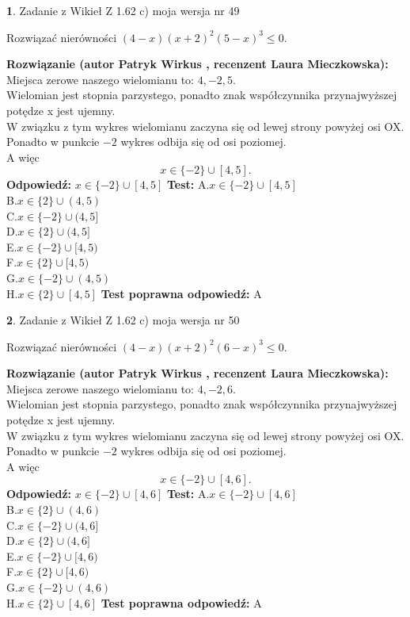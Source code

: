 \documentclass[12pt, a4paper]{article}
\theoremstyle{definition} %
\newtheorem{zad}{}
\newcommand{\zadStart}[1]{\begin{zad}#1\newline}
\newcommand{\zadStop}{\end{zad}}
\newcommand{\rozwStart}[2]{\noindent \textbf{Rozwiązanie (autor #1 , recenzent #2): }\newline}
\newcommand{\rozwStop}{\newline}
\newcommand{\odpStart}{\noindent \textbf{Odpowiedź:}\newline}
\newcommand{\odpStop}{\newline}
\newcommand{\testStart}{\noindent \textbf{Test:}\newline}
\newcommand{\testStop}{\newline}
\newcommand{\kluczStart}{\noindent \textbf{Test poprawna odpowiedź:}\newline}
\newcommand{\kluczStop}{\newline}
\begin{document}
\zadStart{Zadanie z Wikieł Z 1.62 c) moja wersja nr 49}

Rozwiązać nierówności $(4-x)(x+2)^{2}(5-x)^{3}\le0$.
\zadStop
\rozwStart{Patryk Wirkus}{Laura Mieczkowska}
Miejsca zerowe naszego wielomianu to: $4, -2, 5$.\\
Wielomian jest stopnia parzystego, ponadto znak współczynnika przy\linebreak najwyższej potędze x jest ujemny.\\ W związku z tym wykres wielomianu zaczyna się od lewej strony powyżej osi OX.\\
Ponadto w punkcie $-2$ wykres odbija się od osi poziomej.\\
A więc $$x \in \{-2\} \cup [4,5].$$
\rozwStop
\odpStart
$x \in \{-2\} \cup [4,5]$
\odpStop
\testStart
A.$x \in \{-2\} \cup [4,5]$\\
B.$x \in \{2\} \cup (4,5)$\\
C.$x \in \{-2\} \cup (4,5]$\\
D.$x \in \{2\} \cup (4,5]$\\
E.$x \in \{-2\} \cup [4,5)$\\
F.$x \in \{2\} \cup [4,5)$\\
G.$x \in \{-2\} \cup (4,5)$\\
H.$x \in \{2\} \cup [4,5]$
\testStop
\kluczStart
A
\kluczStop



\zadStart{Zadanie z Wikieł Z 1.62 c) moja wersja nr 50}

Rozwiązać nierówności $(4-x)(x+2)^{2}(6-x)^{3}\le0$.
\zadStop
\rozwStart{Patryk Wirkus}{Laura Mieczkowska}
Miejsca zerowe naszego wielomianu to: $4, -2, 6$.\\
Wielomian jest stopnia parzystego, ponadto znak współczynnika przy\linebreak najwyższej potędze x jest ujemny.\\ W związku z tym wykres wielomianu zaczyna się od lewej strony powyżej osi OX.\\
Ponadto w punkcie $-2$ wykres odbija się od osi poziomej.\\
A więc $$x \in \{-2\} \cup [4,6].$$
\rozwStop
\odpStart
$x \in \{-2\} \cup [4,6]$
\odpStop
\testStart
A.$x \in \{-2\} \cup [4,6]$\\
B.$x \in \{2\} \cup (4,6)$\\
C.$x \in \{-2\} \cup (4,6]$\\
D.$x \in \{2\} \cup (4,6]$\\
E.$x \in \{-2\} \cup [4,6)$\\
F.$x \in \{2\} \cup [4,6)$\\
G.$x \in \{-2\} \cup (4,6)$\\
H.$x \in \{2\} \cup [4,6]$
\testStop
\kluczStart
A
\kluczStop
\end{document}
